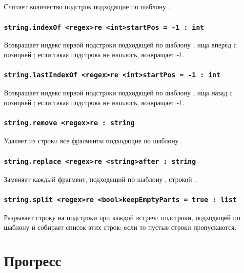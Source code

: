 \documentclass[a4paper, 14pt]{extarticle}
\begin{document}
Считает количество подстрок подходящие по шаблону .

\subsubsection{\lstinline|string.indexOf <regex>re <int>startPos = -1 : int|}

Возвращает индекс первой подстроки подходящей по шаблону , ища вперёд с позицией ; если такая подстрока не нашлось, возвращает -1.

\subsubsection{\lstinline|string.lastIndexOf <regex>re <int>startPos = -1 : int|}

Возвращает индекс первой подстроки подходящей по шаблону , ища назад с позицией ; если такая подстрока не нашлось, возвращает -1.

\subsubsection{\lstinline|string.remove <regex>re : string|}

Удаляет из строки все фрагменты подходящие по шаблону .

\subsubsection{\lstinline|string.replace <regex>re <string>after : string|}

Заменяет каждый фрагмент, подходящий по шаблону , строкой .

\subsubsection{\lstinline|string.split <regex>re <bool>keepEmptyParts = true : list|}

Разрывает строку на подстроки при каждой встречи подстроки, подходящей по шаблону  и собирает список этих строк; если  то пустые строки пропускаются.


\newpage
\section{Прогресс}
\end{document}

